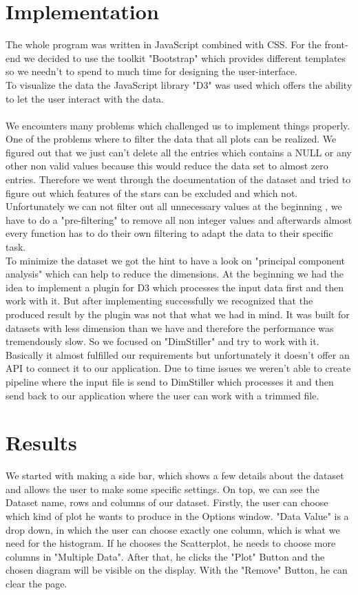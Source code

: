 \documentclass{vgtc}                          %
\begin{document}
\section{Implementation}
The whole program was written in JavaScript combined with CSS. For the front-end we decided to use the toolkit "Bootstrap"\cite{bootstrap} which provides different templates so we needn't to spend to much time for designing the user-interface.\\
To visualize the data the JavaScript library "D3"\cite{d3} was used which offers the ability to let the user interact with the data.\\
\\
We encounters many problems which challenged us to implement things properly. One of the problems where to filter the data that all plots can be realized. We figured out that we just can't delete all the entries which contains a NULL or any other non valid values because this would reduce the data set to almost zero entries. Therefore we went through the documentation of the dataset and tried to figure out which features of the stars can be excluded and which not. Unfortunately we can not filter out all unnecessary values at the beginning , we have to do a "pre-filtering" to remove all non integer values and afterwards almost every function has to do their own filtering to adapt the data to their specific task.\\
To minimize the dataset we got the hint to have a look on "principal component analysis" which can help to reduce the dimensions. At the beginning we had the idea to implement a plugin\cite{pca} for D3 which processes the input data first and then work with it. But after implementing successfully we recognized that the produced result by the plugin was not that what we had in mind. It was built for datasets with less dimension than we have and therefore the performance was tremendously slow. So we focused on "DimStiller"\cite{dimstiller} and try to work with it. Basically it almost fulfilled our requirements but unfortunately it doesn't offer an API to connect it to our application. Due to time issues we weren't able to create pipeline where the input file is send to DimStiller which processes it and then send back to our application where the user can work with a trimmed file.
\section{Results}
We started with making a side bar, which shows a few details about the dataset and allows the user to make some specific settings.
On top, we can see the Dataset name, rows and columns of our dataset.
Firstly, the user can choose which kind of plot he wants to produce in the Options window. 
"Data Value" is a drop down, in which the user can choose exactly one column, which is what we need for the histogram.
If he chooses the Scatterplot, he needs to choose more columns in "Multiple Data".
After that, he clicks the "Plot" Button and the chosen diagram will be visible on the display. With the "Remove" Button, he can clear the page.
\end{document}
